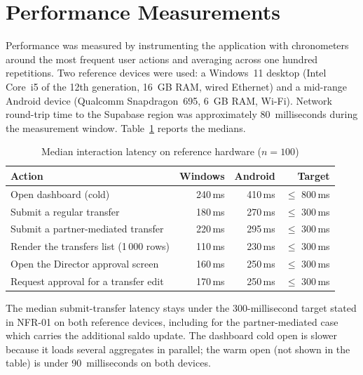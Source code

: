 \section{Performance Measurements}
\label{sec:perf}

Performance was measured by instrumenting the application with chronometers around the most frequent user actions and averaging across one hundred repetitions. Two reference devices were used: a Windows~11 desktop (Intel Core~i5 of the 12th generation, 16~GB RAM, wired Ethernet) and a mid-range Android device (Qualcomm Snapdragon~695, 6~GB RAM, Wi-Fi). Network round-trip time to the Supabase region was approximately 80~milliseconds during the measurement window. Table~\ref{tab:perf} reports the medians.

{\singlespacing
\begin{table}[h]
  \caption{Median interaction latency on reference hardware ($n=100$)}
  \label{tab:perf}
  \centering
  \begin{tabular}{lrrr}
    \toprule
    \textbf{Action}                              & \textbf{Windows} & \textbf{Android} & \textbf{Target}\\
    \midrule
    Open dashboard (cold)                         & 240\,ms          & 410\,ms          & $\leq$ 800\,ms\\
    Submit a regular transfer                    & 180\,ms          & 270\,ms          & $\leq$ 300\,ms\\
    Submit a partner-mediated transfer            & 220\,ms          & 295\,ms          & $\leq$ 300\,ms\\
    Render the transfers list (1\,000 rows)       & 110\,ms          & 230\,ms          & $\leq$ 300\,ms\\
    Open the Director approval screen            & 160\,ms          & 250\,ms          & $\leq$ 300\,ms\\
    Request approval for a transfer edit         & 170\,ms          & 250\,ms          & $\leq$ 300\,ms\\
    \bottomrule
  \end{tabular}
\end{table}
}

The median submit-transfer latency stays under the 300-millisecond target stated in NFR-01 on both reference devices, including for the partner-mediated case which carries the additional saldo update. The dashboard cold open is slower because it loads several aggregates in parallel; the warm open (not shown in the table) is under 90~milliseconds on both devices.

